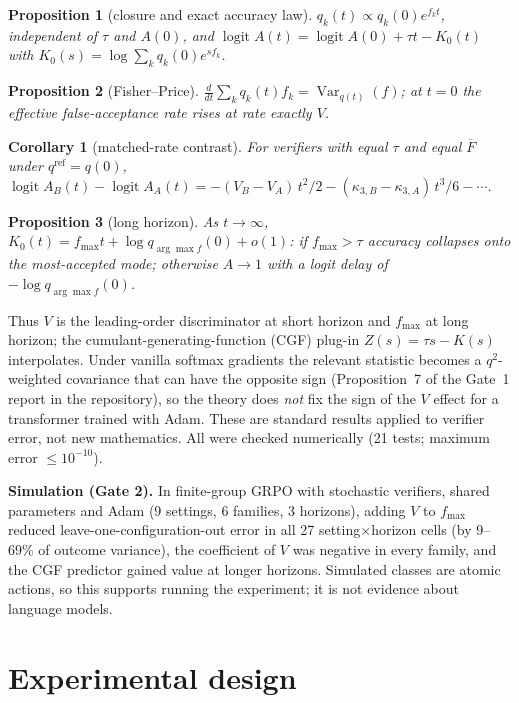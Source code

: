 \documentclass[11pt]{article}
\newtheorem{proposition}{Proposition}
\newtheorem{corollary}{Corollary}
\newcommand{\Fbar}{\overline{F}}
\newcommand{\fmax}{f_{\max}}
\newcommand{\qref}{q^{\mathrm{ref}}}
\begin{document}
\begin{proposition}[closure and exact accuracy law]
$q_k(t)\propto q_k(0)e^{f_k t}$, independent of $\tau$ and $A(0)$, and
$\operatorname{logit}A(t)=\operatorname{logit}A(0)+\tau t-K_0(t)$ with $K_0(s)=\log\sum_k q_k(0)e^{s f_k}$.
\end{proposition}
\begin{proposition}[Fisher--Price]
$\frac{d}{dt}\sum_k q_k(t) f_k=\operatorname{Var}_{q(t)}(f)$; at $t=0$ the effective false-acceptance rate rises at rate exactly $V$.
\end{proposition}
\begin{corollary}[matched-rate contrast]
For verifiers with equal $\tau$ and equal $\Fbar$ under $\qref=q(0)$,
$\operatorname{logit}A_B(t)-\operatorname{logit}A_A(t)=-(V_B-V_A)\,t^2/2-(\kappa_{3,B}-\kappa_{3,A})\,t^3/6-\cdots$.
\end{corollary}
\begin{proposition}[long horizon]
As $t\to\infty$, $K_0(t)=\fmax t+\log q_{\arg\max f}(0)+o(1)$: if $\fmax>\tau$ accuracy collapses onto the most-accepted mode; otherwise $A\to1$ with a logit delay of $-\log q_{\arg\max f}(0)$.
\end{proposition}
Thus $V$ is the leading-order discriminator at short horizon and $\fmax$ at long horizon; the cumulant-generating-function (CGF) plug-in $Z(s)=\tau s-K(s)$ interpolates. Under vanilla softmax gradients the relevant statistic becomes a $q^2$-weighted covariance that can have the opposite sign (Proposition~7 of the Gate~1 report in the repository), so the theory does \emph{not} fix the sign of the $V$ effect for a transformer trained with Adam. These are standard results applied to verifier error, not new mathematics. All were checked numerically (21 tests; maximum error $\le10^{-10}$).

\textbf{Simulation (Gate 2).} In finite-group GRPO with stochastic verifiers, shared parameters and Adam (9 settings, 6 families, 3 horizons), adding $V$ to $\fmax$ reduced leave-one-configuration-out error in all 27 setting$\times$horizon cells (by 9--69\% of outcome variance), the coefficient of $V$ was negative in every family, and the CGF predictor gained value at longer horizons. Simulated classes are atomic actions, so this supports running the experiment; it is not evidence about language models.

\section{Experimental design}\label{sec:design}
\end{document}
